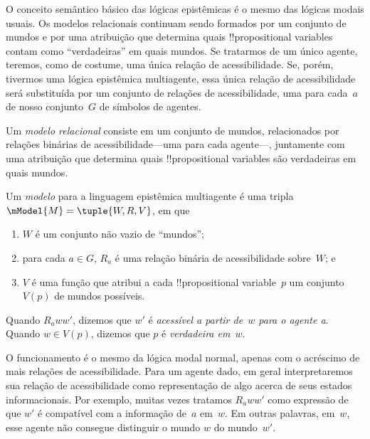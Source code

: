 \documentclass[../../../include/open-logic-section]{subfiles}
\begin{document}


O conceito semântico básico das lógicas epistêmicas é o mesmo das
lógicas modais usuais. Os modelos relacionais continuam sendo formados
por um conjunto de mundos e por uma atribuição que determina quais
!!{propositional variable}s contam como ``verdadeiras'' em quais
mundos. Se tratarmos de um único agente, teremos, como de costume, uma
única relação de acessibilidade. Se, porém, tivermos uma lógica
epistêmica multiagente, essa única relação de acessibilidade será
substituída por um conjunto de relações de acessibilidade, uma para
cada~$a$ de nosso conjunto~$G$ de símbolos de agentes.

Um \emph{modelo relacional} consiste em um conjunto de mundos,
relacionados por relações binárias de acessibilidade---uma para cada
agente---, juntamente com uma atribuição que determina quais
!!{propositional variable}s são verdadeiras em quais mundos.

\begin{defn}
  Um \emph{modelo} para a linguagem epistêmica multiagente é uma tripla
  $\mModel{M} = \tuple{W, R, V}$, em que
  \begin{enumerate}
  \item $W$ é um conjunto não vazio de ``mundos'';
  \item para cada $a \in G$, ${R}_a$ é uma relação binária de acessibilidade
  sobre~$W$; e
  \item $V$ é uma função que atribui a cada !!{propositional
    variable}~$p$ um conjunto $V(p)$ de mundos possíveis.
  \end{enumerate}
  Quando $R_a ww'$, dizemos que $w'$ é \emph{acessível a partir
    de~$w$ para o agente a}. Quando $w \in V(p)$, dizemos que $p$ é
  \emph{verdadeira em}~$w$.
\end{defn}

O funcionamento é o mesmo da lógica modal normal, apenas com o
acréscimo de mais relações de acessibilidade. Para um agente dado, em
geral interpretaremos sua relação de acessibilidade como representação
de algo acerca de seus estados informacionais. Por exemplo, muitas
vezes tratamos $R_a ww'$ como expressão de que $w'$ é compatível com a
informação de~$a$ em~$w$. Em outras palavras, em~$w$, esse agente não
consegue distinguir o mundo $w$ do mundo~$w'$.  
\end{document}

